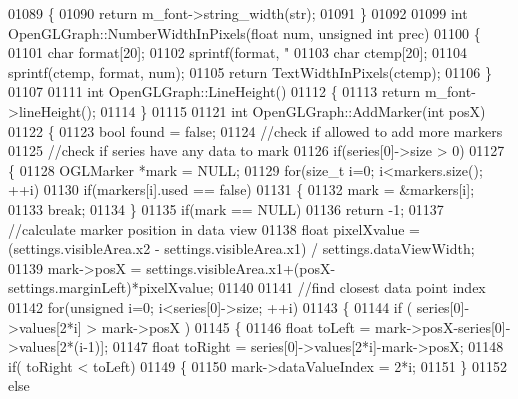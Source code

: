 \begin{DoxyCode}
{{{{{{{{{01089 \{
01090     \textcolor{keywordflow}{return} m_font->string_width(str);
01091 \}
01092 
01099 \textcolor{keywordtype}{int} OpenGLGraph::NumberWidthInPixels(\textcolor{keywordtype}{float} num, \textcolor{keywordtype}{unsigned} \textcolor{keywordtype}{int} prec)
01100 \{
01101     \textcolor{keywordtype}{char} format[20];
01102     sprintf(format, \textcolor{stringliteral}{"%
01103     \textcolor{keywordtype}{char} ctemp[20];
01104     sprintf(ctemp, format, num);
01105     \textcolor{keywordflow}{return} TextWidthInPixels(ctemp);
01106 \}
01107 
01111 \textcolor{keywordtype}{int} OpenGLGraph::LineHeight()
01112 \{
01113     \textcolor{keywordflow}{return} m_font->lineHeight();
01114 \}
01115 
01121 \textcolor{keywordtype}{int} OpenGLGraph::AddMarker(\textcolor{keywordtype}{int} posX)
01122 \{
01123     \textcolor{keywordtype}{bool} found = \textcolor{keyword}{false};
01124     \textcolor{comment}{//check if allowed to add more markers}
01125     \textcolor{comment}{//check if series have any data to mark}
01126     \textcolor{keywordflow}{if}(series[0]->size > 0)
01127     \{
01128         OGLMarker *mark = NULL;
01129         \textcolor{keywordflow}{for}(\textcolor{keywordtype}{size\_t} i=0; i<markers.size(); ++i)
01130             \textcolor{keywordflow}{if}(markers[i].used == \textcolor{keyword}{false})
01131             \{
01132                 mark = &markers[i];
01133                 \textcolor{keywordflow}{break};
01134             \}
01135         \textcolor{keywordflow}{if}(mark == NULL)
01136             \textcolor{keywordflow}{return} -1;
01137         \textcolor{comment}{//calculate marker position in data view}
01138         \textcolor{keywordtype}{float} pixelXvalue =(settings.visibleArea.x2 - settings.visibleArea.x1) / 
      settings.dataViewWidth;
01139         mark->posX = settings.visibleArea.x1+(posX-settings.marginLeft)*pixelXvalue;
01140 
01141         \textcolor{comment}{//find closest data point index}
01142         \textcolor{keywordflow}{for}(\textcolor{keywordtype}{unsigned} i=0; i<series[0]->size; ++i)
01143         \{
01144             \textcolor{keywordflow}{if} ( series[0]->values[2*i] > mark->posX )
01145             \{
01146                 \textcolor{keywordtype}{float} toLeft = mark->posX-series[0]->values[2*(i-1)];
01147                 \textcolor{keywordtype}{float} toRight = series[0]->values[2*i]-mark->posX;
01148                 \textcolor{keywordflow}{if}( toRight < toLeft)
01149                 \{
01150                     mark->dataValueIndex = 2*i;
01151                 \}
01152                 \textcolor{keywordflow}{else}
}}}}}}}}}}
\end{DoxyCode}
